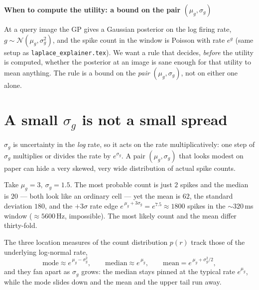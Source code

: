 \documentclass[11pt]{article}
\begin{document}
\begin{center}
{\large\bfseries When to compute the utility: a bound on the pair $(\mu_g,\sigma_g)$}
\end{center}
\medskip

\noindent
At a query image the GP gives a Gaussian posterior on the log firing rate,
$g\sim\mathcal{N}(\mu_g,\sigma_g^2)$, and the spike count in the window is Poisson
with rate $e^{g}$ (same setup as \texttt{laplace\_explainer.tex}). We want a rule
that decides, \emph{before} the utility is computed, whether the posterior at an
image is sane enough for that utility to mean anything. The rule is a bound on the
\emph{pair} $(\mu_g,\sigma_g)$, not on either one alone.

\section{A small $\sigma_g$ is not a small spread}
$\sigma_g$ is uncertainty in the \emph{log} rate, so it acts on the rate
multiplicatively: one step of $\sigma_g$ multiplies or divides the rate by
$e^{\sigma_g}$. A pair $(\mu_g,\sigma_g)$ that looks modest on paper can hide a
very skewed, very wide distribution of actual spike counts.

Take $\mu_g=3,\ \sigma_g=1.5$. The most probable count is just $2$ spikes and the
median is $20$ --- both look like an ordinary cell --- yet the mean is $62$, the
standard deviation $180$, and the $+3\sigma$ rate edge
$e^{\,\mu_g+3\sigma_g}=e^{7.5}\approx 1800$ spikes in the ${\sim}320$\,ms window
($\approx 5600$\,Hz, impossible). The most likely count and the mean differ
thirty-fold.

The three location measures of the count distribution $p(r)$ track those of the
underlying log-normal rate,
\[
\text{mode}\approx e^{\,\mu_g-\sigma_g^2},\qquad
\text{median}\approx e^{\,\mu_g},\qquad
\text{mean}=e^{\,\mu_g+\sigma_g^2/2},
\]
and they fan apart as $\sigma_g$ grows: the median stays pinned at the typical
rate $e^{\mu_g}$, while the mode slides down and the mean and the upper tail run
away.
\end{document}
